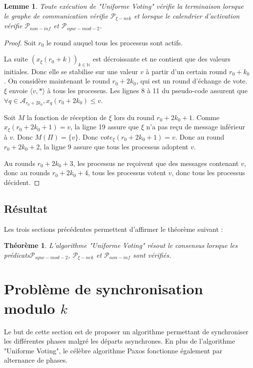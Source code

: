 \documentclass{article}
\newtheorem{lemma}{Lemme}[section]
\newtheorem{theorem}{Théorème}
\begin{document}
	\begin{lemma}
		Toute exécution de "Uniforme Voting" vérifie la terminaison lorsque le graphe de communication vérifie $\mathcal{P}_{\xi-nek}$
		et lorsque le calendrier d'activation vérifie $\mathcal{P}_{non-inf}$ et $\mathcal{P}_{sync-mod-2}$.
	\end{lemma}
	\begin{proof}
		Soit $r_0$ le round auquel tous les processus sont actifs.

		La suite $(x_\xi(r_0+k))_{k \in \mathds{N}}$ est décroissante et ne contient que des valeurs initiales. Donc elle se stabilise sur une valeur $v$ à partir d'un certain round $r_0+k_0$.
		On considère maintenant le round $r_0+2k_0$, qui est un round d'échange de vote.
		$\xi$ envoie $\langle v, * \rangle$ à tous les processus. Les lignes 8 à 11 du pseudo-code assurent que $\forall q \in \mathcal{A}_{r_0+2k_0}, x_q(r_0+2k_0) \leq v$.

		Soit $M$ la fonction de réception de $\xi$ lors du round $r_0+2k_0+1$.
		Comme $x_\xi(r_0+2k_0+1) = v$, la ligne 19 assure que $\xi$ n'a pas reçu de message inférieur à $v$.
		Donc $M(\Pi) = \{v\}$. Donc $vote_\xi(r_0+2k_0+1) = v$. Donc au round $r_0+2k_0+2$, la ligne 9 assure que tous les processus adoptent $v$.

		Au rounds $r_0+2k_0+3$, les processus ne reçoivent que des messages contenant $v$, donc au rounds $r_0+2k_0+4$, tous les processus votent $v$, donc tous les processus décident.
	\end{proof}
\subsection{Résultat}

Les trois sections précédentes permettent d'affirmer le théorème suivant :

\begin{theorem}
	L'algorithme "Uniforme Voting" résout le consensus lorsque les prédicats$\mathcal{P}_{sync-mod-2}$, $\mathcal{P}_{\xi-nek}$ et $\mathcal{P}_{non-inf}$ sont vérifiés.
\end{theorem}

\section{Problème de synchronisation modulo $k$}

Le but de cette section est de proposer un algorithme permettant de synchroniser les différentes phases malgré les départs asynchrones.
En plus de l'algorithme "Uniforme Voting", le célèbre algorithme Paxos \cite{paxos} fonctionne également par alternance de phases.
\end{document}
